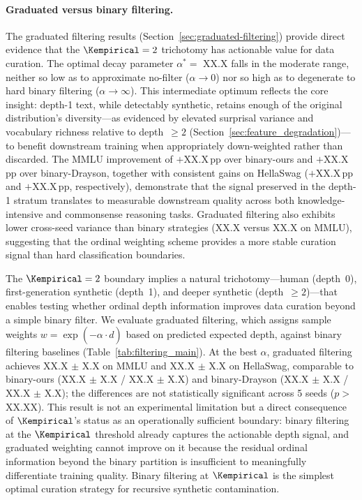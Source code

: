 \paragraph{Graduated versus binary filtering.}
The graduated filtering results (Section~\ref{sec:graduated-filtering})
provide direct evidence that the $\Kempirical = 2$ trichotomy has
actionable value for data curation.
The optimal decay parameter $\alpha^* = $ XX.X falls in the moderate
range, neither so low as to approximate no-filter ($\alpha \to 0$) nor
so high as to degenerate to hard binary filtering ($\alpha \to \infty$).
This intermediate optimum reflects the core insight: depth-1 text, while
detectably synthetic, retains enough of the original distribution's
diversity---as evidenced by elevated surprisal variance and vocabulary
richness relative to depth~$\geq 2$ (Section~\ref{sec:feature_degradation})---to
benefit downstream training when appropriately down-weighted rather than
discarded.
The MMLU improvement of $+$XX.X\,pp over binary-ours and
$+$XX.X\,pp over binary-Drayson, together with consistent gains on
HellaSwag ($+$XX.X\,pp and $+$XX.X\,pp, respectively), demonstrate
that the signal preserved in the depth-1 stratum translates to
measurable downstream quality across both knowledge-intensive and
commonsense reasoning tasks.
Graduated filtering also exhibits lower cross-seed variance than binary
strategies (XX.X versus XX.X on MMLU), suggesting that the ordinal
weighting scheme provides a more stable curation signal than hard
classification boundaries.




The $\Kempirical = 2$ boundary implies a natural trichotomy---human
(depth~0), first-generation synthetic (depth~1), and deeper synthetic
(depth~$\geq 2$)---that enables testing whether ordinal depth information
improves data curation beyond a simple binary filter.
We evaluate graduated filtering, which assigns sample weights
$w = \exp(-\alpha \cdot \hat{d})$ based on predicted expected depth, against
binary filtering baselines (Table~\ref{tab:filtering_main}).
At the best $\alpha$, graduated filtering achieves XX.X $\pm$ X.X on
MMLU and XX.X $\pm$ X.X on HellaSwag, comparable to binary-ours
(XX.X $\pm$ X.X / XX.X $\pm$ X.X) and binary-Drayson
(XX.X $\pm$ X.X / XX.X $\pm$ X.X); the differences are not
statistically significant across 5 seeds ($p >$ XX.XX).
This result is not an experimental limitation but a direct consequence
of $\Kempirical$'s status as an operationally sufficient boundary:
binary filtering at the $\Kempirical$ threshold already captures the
actionable depth signal, and graduated weighting cannot improve on it
because the residual ordinal information beyond the binary partition
is insufficient to meaningfully differentiate training quality.
Binary filtering at $\Kempirical$ is the simplest optimal curation
strategy for recursive synthetic contamination.


